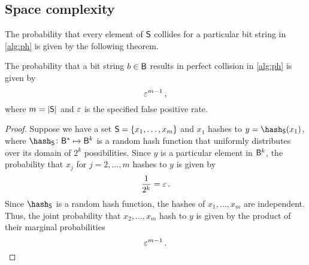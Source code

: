 \documentclass[ ../main.tex]{subfiles}
\begin{document}
\subsection{Space complexity}
The probability that every element of $\Set{S}$ collides for a particular bit string in \cref{alg:ph} is given by the following theorem.
\begin{theorem}
The probability that a bit string $b \in \Set{B}$ results in perfect collision in \cref{alg:ph} is given by
\begin{equation}
\label{eq:p_m_N}
    \varepsilon^{m-1}\,,
\end{equation}
where $m = \Card{\Set{S}}$ and $\varepsilon$ is the specified false positive rate.
\end{theorem}
\begin{proof}
Suppose we have a set $\Set{S} = \{x_1,\ldots,x_m\}$ and $x_1$ hashes to $y = \hash_{\Set{S}}(x_1)$, where $\hash_{\Set{S}} \colon \Set{B}^{*} \mapsto \Set{B}^k$ is a random hash function that uniformly distributes over its domain of $2^k$ possibilities. Since $y$ is a particular element in $\Set{B}^k$, the probability that $x_j$ for $j=2,\ldots,m$ hashes to $y$ is given by
\begin{equation}
    \frac{1}{2^k} = \varepsilon\,.
\end{equation}
Since $\hash_{\Set{S}}$ is a random hash function, the hashes of $x_1,\ldots,x_m$ are independent. Thus, the joint probability that $x_2, \ldots, x_m$ hash to $y$ is given by the product of their marginal probabilities
\begin{equation}
    \varepsilon^{m-1}\,.
\end{equation}
\end{proof}
\end{document}
